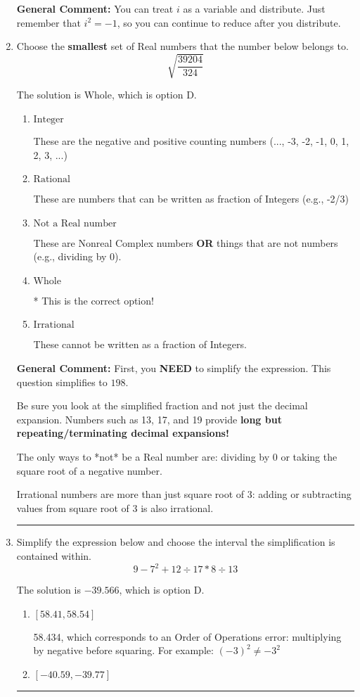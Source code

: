 \documentclass{extbook}[14pt]
\newcommand{\litem}[1]{\item #1

\rule{\textwidth}{0.4pt}}
\begin{document}
\begin{enumerate}
{\textbf{General Comment:} You can treat $i$ as a variable and distribute. Just remember that $i^2=-1$, so you can continue to reduce after you distribute.
}
\litem{
Choose the \textbf{smallest} set of Real numbers that the number below belongs to.
\[ \sqrt{\frac{39204}{324}} \]

The solution is \( \text{Whole} \), which is option D.\begin{enumerate}[label=\Alph*.]
\item \( \text{Integer} \)

These are the negative and positive counting numbers (..., -3, -2, -1, 0, 1, 2, 3, ...)
\item \( \text{Rational} \)

These are numbers that can be written as fraction of Integers (e.g., -2/3)
\item \( \text{Not a Real number} \)

These are Nonreal Complex numbers \textbf{OR} things that are not numbers (e.g., dividing by 0).
\item \( \text{Whole} \)

* This is the correct option!
\item \( \text{Irrational} \)

These cannot be written as a fraction of Integers.
\end{enumerate}

\textbf{General Comment:} First, you \textbf{NEED} to simplify the expression. This question simplifies to $198$. 
 
 Be sure you look at the simplified fraction and not just the decimal expansion. Numbers such as 13, 17, and 19 provide \textbf{long but repeating/terminating decimal expansions!} 
 
 The only ways to *not* be a Real number are: dividing by 0 or taking the square root of a negative number. 
 
 Irrational numbers are more than just square root of 3: adding or subtracting values from square root of 3 is also irrational.
}
\litem{
Simplify the expression below and choose the interval the simplification is contained within.
\[ 9 - 7^2 + 12 \div 17 * 8 \div 13 \]

The solution is \( -39.566 \), which is option D.\begin{enumerate}[label=\Alph*.]
\item \( [58.41, 58.54] \)

 58.434, which corresponds to an Order of Operations error: multiplying by negative before squaring. For example: $(-3)^2 \neq -3^2$
\item \( [-40.59, -39.77] \)


\end{enumerate}}
\end{enumerate}
\end{document}
